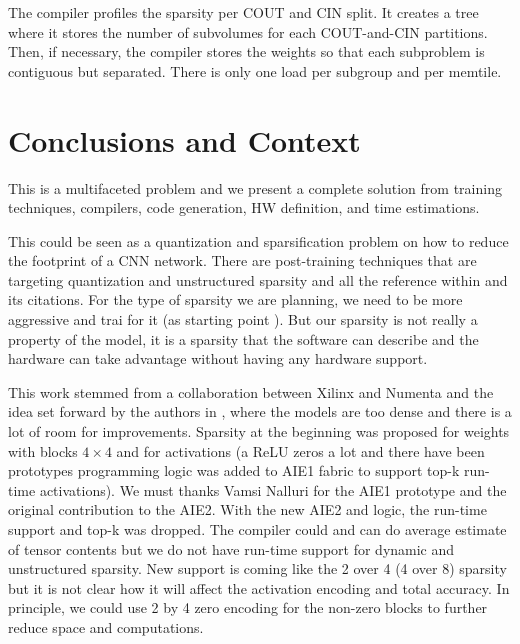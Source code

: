 \documentclass[conference]{IEEEtran}
\begin{document}
The compiler profiles the sparsity per COUT and CIN split. It creates
a tree where it stores the number of subvolumes for each COUT-and-CIN
partitions. Then, if necessary, the compiler stores the weights so that
each subproblem is contiguous but separated. There is only one load
per subgroup and per memtile.






\section{Conclusions and Context}
This is a multifaceted problem and we present a complete solution from
training techniques, compilers, code generation, HW definition, and
time estimations.

This could be seen as a quantization and sparsification problem on how
to reduce the footprint of a CNN network. There are post-training
techniques that are targeting quantization and unstructured sparsity
\cite{frantar2023gptq} and all the reference within and its
citations. For the type of sparsity we are planning, we need to be
more aggressive and trai for it (as starting point
\cite{abs-2102-11289}).  But our sparsity is not really a property of
the model, it is a sparsity that the software can describe and the
hardware can take advantage without having any hardware support.

This work stemmed from a collaboration between Xilinx and Numenta and
the idea set forward by the authors in \cite{ahmad2019dense}, where
the models are too dense and there is a lot of room for
improvements. Sparsity at the beginning was proposed for weights with
blocks $4\times 4$ and for activations (a ReLU zeros a lot and there
have been prototypes programming logic was added to AIE1 fabric to
support top-k run-time activations). We must thanks Vamsi Nalluri for
the AIE1 prototype and the original contribution to the AIE2. With the
new AIE2 and logic, the run-time support and top-k was dropped. The
compiler could and can do average estimate of tensor contents but we
do not have run-time support for dynamic and unstructured
sparsity. New support is coming like the 2 over 4 (4 over 8) sparsity
but it is not clear how it will affect the activation encoding and
total accuracy. In principle, we could use 2 by 4 zero encoding for
the non-zero blocks to further reduce space and computations.
\end{document}
